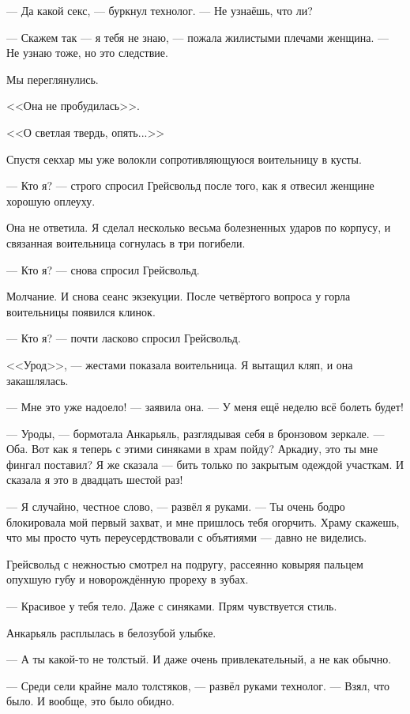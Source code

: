 --- Да какой секс, --- буркнул технолог.
--- Не узнаёшь, что ли?

--- Скажем так --- я тебя не знаю, --- пожала жилистыми плечами женщина.
--- Не узнаю тоже, но это следствие.

Мы переглянулись.

<<Она не пробудилась>>.

<<О светлая твердь, опять...>>

Спустя секхар мы уже волокли сопротивляющуюся воительницу в кусты.

--- Кто я? --- строго спросил Грейсвольд после того, как я отвесил женщине хорошую оплеуху.

Она не ответила.
Я сделал несколько весьма болезненных ударов по корпусу, и связанная воительница согнулась в три погибели.

--- Кто я? --- снова спросил Грейсвольд.

Молчание.
И снова сеанс экзекуции.
После четвёртого вопроса у горла воительницы появился клинок.

--- Кто я? --- почти ласково спросил Грейсвольд.

<<Урод>>, --- жестами показала воительница.
Я вытащил кляп, и она закашлялась.

--- Мне это уже надоело! --- заявила она.
--- У меня ещё неделю всё болеть будет!

\asterism

--- Уроды, --- бормотала Анкарьяль, разглядывая себя в бронзовом зеркале.
--- Оба.
Вот как я теперь с этими синяками в храм пойду?
Аркадиу, это ты мне фингал поставил?
Я же сказала --- бить только по закрытым одеждой участкам.
И сказала я это в двадцать шестой раз!

--- Я случайно, честное слово, --- развёл я руками.
--- Ты очень бодро блокировала мой первый захват, и мне пришлось тебя огорчить.
Храму скажешь, что мы просто чуть переусердствовали с объятиями --- давно не виделись.

Грейсвольд с нежностью смотрел на подругу, рассеянно ковыряя пальцем опухшую губу и новорождённую прореху в зубах.

--- Красивое у тебя тело.
Даже с синяками.
Прям чувствуется стиль.

Анкарьяль расплылась в белозубой улыбке.

--- А ты какой-то не толстый.
И даже очень привлекательный, а не как обычно.

--- Среди сели крайне мало толстяков, --- развёл руками технолог.
--- Взял, что было.
И вообще, это было обидно.

